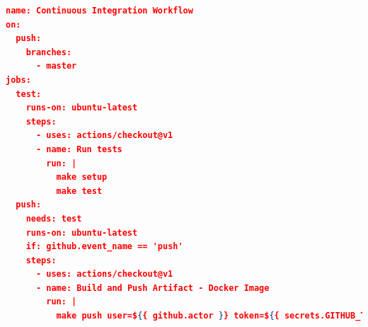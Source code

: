 \documentclass[a4paper,11pt]{book}
\begin{document}
\begin{lstlisting}[language=json,firstnumber=1]
name: Continuous Integration Workflow
on:
  push:
    branches:
      - master
jobs:
  test:
    runs-on: ubuntu-latest
    steps:
      - uses: actions/checkout@v1
      - name: Run tests
        run: |
          make setup
          make test
  push:
    needs: test
    runs-on: ubuntu-latest
    if: github.event_name == 'push'
    steps:
      - uses: actions/checkout@v1
      - name: Build and Push Artifact - Docker Image
        run: |
          make push user=${{ github.actor }} token=${{ secrets.GITHUB_TOKEN }}
\end{lstlisting}

\thispagestyle{empty}


\end{document}

